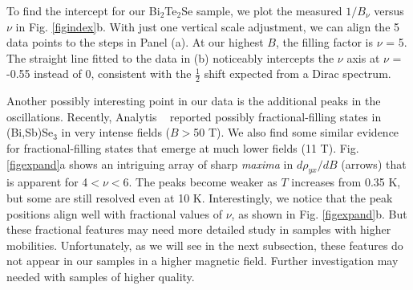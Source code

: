 To find the intercept for our Bi$_2$Te$_2$Se sample, we plot the measured $1/B_{\nu}$ versus $\nu$ in Fig. \ref{figindex}b.
With just one vertical scale adjustment, we can align the 5 data points to the steps in Panel (a).  At our highest $B$, the filling factor is $\nu$ = 5.
The straight line fitted to the data in (b) noticeably intercepts the $\nu$ axis at $\nu$ = -0.55 instead of 0, consistent with the $\frac12$ shift expected from a Dirac spectrum.  

Another possibly interesting point in our data is the additional peaks in the oscillations. Recently, Analytis \etal~\cite{Analytis} reported possibly fractional-filling states in (Bi,Sb)Se$_3$ in very intense fields ($B>$50 T). We also find some similar evidence for fractional-filling states that
emerge at much lower fields (11 T).  Fig. \ref{figexpand}a shows an intriguing array of sharp \emph{maxima} in $d\rho_{yx}/dB$ (arrows) that is apparent for 4$<\nu <$6. The peaks become weaker as $T$ increases from 0.35 K, but some 
are still resolved even at 10 K.  Interestingly, we notice that the peak positions align well with fractional values of $\nu$, as shown in Fig. \ref{figexpand}b. But these fractional features may need more detailed study in samples with higher mobilities. Unfortunately, as we will see in the next subsection, these features do not appear in our samples in a higher magnetic field. Further investigation may needed with samples of higher quality.
